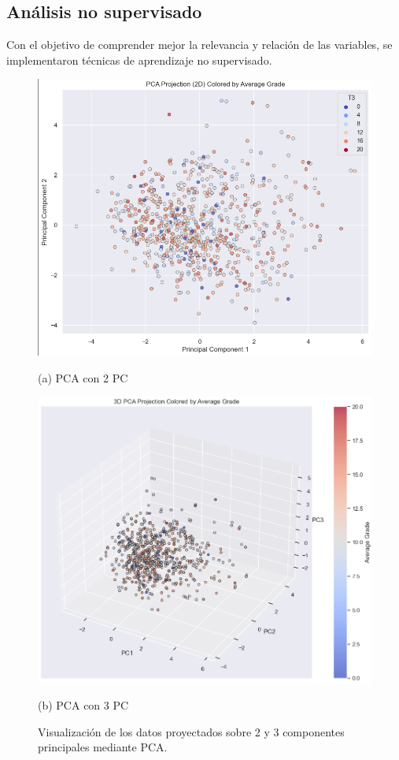 \documentclass{article}
\begin{document}
\subsection{Análisis no supervisado}


Con el objetivo de comprender mejor la relevancia y relación de las variables, se implementaron técnicas de aprendizaje no supervisado. 

\begin{figure}[h!]
  \centering
  \begin{minipage}[b]{0.45\textwidth}
      \centering
      \includegraphics[scale=0.30]{PCA2PC.png}
      \caption{(a) PCA con 2 PC}
  \end{minipage}
  \hfill
  \begin{minipage}[b]{0.45\textwidth}
      \centering
      \includegraphics[scale=0.28]{PCA3PC.png}
      \caption{(b) PCA con 3 PC}
  \end{minipage}
  \caption{Visualización de los datos proyectados sobre 2 y 3 componentes principales mediante PCA.}
\end{figure}
\end{document}

